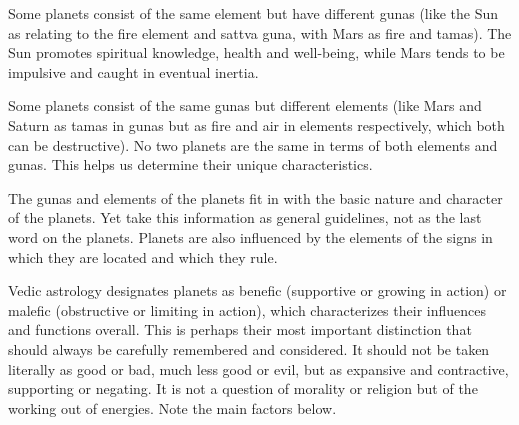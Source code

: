 Some planets consist of the same element but have different gunas (like the Sun as relating to the fire element and sattva guna, with Mars as fire and tamas). The Sun promotes spiritual knowledge, health and well-being, while Mars tends to be impulsive and caught in eventual inertia.

 

Some planets consist of the same gunas but different elements (like Mars and Saturn as tamas in gunas but as fire and air in elements respectively, which both can be destructive). No two planets are the same in terms of both elements and gunas. This helps us determine their unique characteristics.

 

The gunas and elements of the planets fit in with the basic nature and character of the planets. Yet take this information as general guidelines, not as the last word on the planets. Planets are also influenced by the elements of the signs in which they are located and which they rule.

 


 

Vedic astrology designates planets as benefic (supportive or growing in action) or malefic (obstructive or limiting in action), which characterizes their influences and functions overall. This is perhaps their most important distinction that should always be carefully remembered and considered. It should not be taken literally as good or bad, much less good or evil, but as expansive and contractive, supporting or negating. It is not a question of morality or religion but of the working out of energies. Note the main factors below.

 

